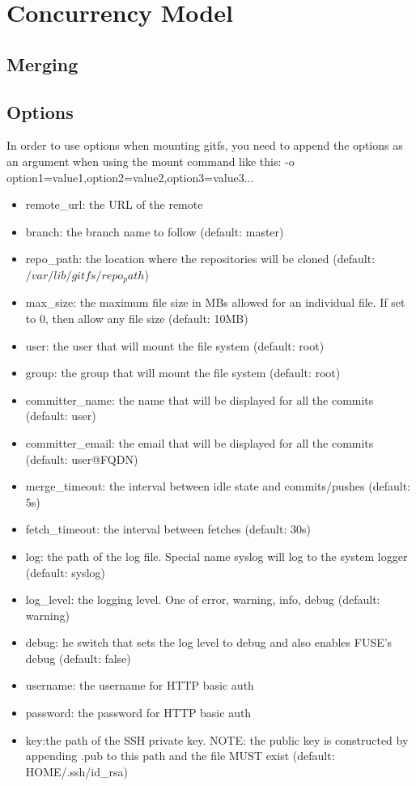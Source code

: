 \chapter{Concurrency Model}

\label{ch:concurrencymodel}

\section{Merging}
\section{Options}
In order to use options when mounting gitfs, you need to append the options as an argument when using the mount command like this: -o option1=value1,option2=value2,option3=value3...

\begin{itemize}
    \item remote\_url: the URL of the remote
    \item branch: the branch name to follow (default: master)
    \item repo\_path: the location where the repositories will be cloned
    (default: $/var/lib/gitfs/repo_path$)
    \item max\_size: the maximum file size in MBs allowed for an individual file. If set to 0, then allow any file size (default: 10MB)
    \item user: the user that will mount the file system (default: root)
    \item group: the group that will mount the file system (default: root)
    \item committer\_name: the name that will be displayed for all the commits (default: user)
    \item committer\_email: the email that will be displayed for all the commits (default: user@FQDN)
    \item merge\_timeout:	the interval between idle state and commits/pushes (default: 5s)
    \item fetch\_timeout: 	the interval between fetches (default: 30s)
    \item log: the path of the log file. Special name syslog will log to the system logger (default: syslog)
    \item log\_level: the logging level. One of error, warning, info, debug (default: warning)
    \item debug: he switch that sets the log level to debug and also enables FUSE’s debug (default: false)
    \item username: the username for HTTP basic auth 
    \item password: the password for HTTP basic auth
    \item key:the path of the SSH private key. NOTE: the public key is constructed by appending .pub to this path and the file MUST exist (default: \textdollar HOME/.ssh/id\_rsa)
\end{itemize}
